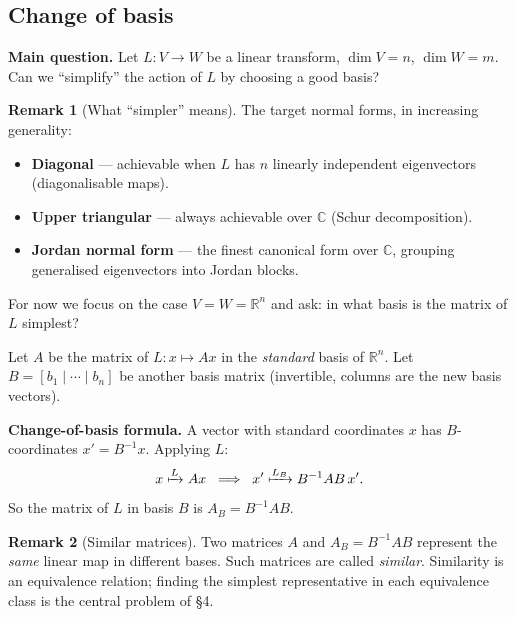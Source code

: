 \documentclass[11pt]{article}
\theoremstyle{definition}
\newtheorem{remark}{Remark}[section]
\theoremstyle{plain}
\begin{document}
\subsection{Change of basis}

\textbf{Main question.}  Let $L: V \to W$ be a linear transform,
$\dim V = n$, $\dim W = m$.  Can we ``simplify'' the action of $L$ by
choosing a good basis?

\begin{remark}[What ``simpler'' means]
  The target normal forms, in increasing generality:
  \begin{itemize}
    \item \textbf{Diagonal} --- achievable when $L$ has $n$ linearly
      independent eigenvectors (diagonalisable maps).
    \item \textbf{Upper triangular} --- always achievable over $\mathbb{C}$
      (Schur decomposition).
    \item \textbf{Jordan normal form} --- the finest canonical form over
      $\mathbb{C}$, grouping generalised eigenvectors into Jordan blocks.
  \end{itemize}
  For now we focus on the case $V = W = \mathbb{R}^n$ and ask: in what
  basis is the matrix of $L$ simplest?
\end{remark}

\noindent
Let $A$ be the matrix of $L: x \mapsto Ax$ in the \emph{standard} basis
of $\mathbb{R}^n$.  Let $B = [b_1 \mid \cdots \mid b_n]$ be another
basis matrix (invertible, columns are the new basis vectors).

\medskip\noindent
\textbf{Change-of-basis formula.}  A vector with standard coordinates $x$
has $B$-coordinates $x' = B^{-1}x$.  Applying $L$:
\[
  x \xmapsto{L} Ax
  \;\;\Longrightarrow\;\;
  x' \xmapsto{L_B} B^{-1}AB\, x'.
\]
So the matrix of $L$ in basis $B$ is $\boxed{A_B = B^{-1}AB}$.

\begin{remark}[Similar matrices]
  Two matrices $A$ and $A_B = B^{-1}AB$ represent the \emph{same} linear
  map in different bases.  Such matrices are called \emph{similar}.
  Similarity is an equivalence relation; finding the simplest
  representative in each equivalence class is the central problem of
  \S4.
\end{remark}
\end{document}
